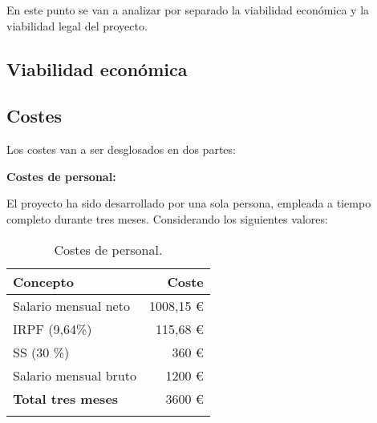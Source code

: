 En este punto se van a analizar por separado la viabilidad económica y la viabilidad legal del proyecto.

\subsection{Viabilidad económica}

\subsection{Costes}\label{costes}

Los costes van a ser desglosados en dos partes:

\textbf{Costes de personal:}

El proyecto ha sido desarrollado por una sola persona, empleada a tiempo completo durante tres meses. Considerando los siguientes valores:


\begin{longtable}[]{@{}lr@{}}
\toprule
\begin{minipage}[b]{0.38\columnwidth}\raggedright\strut
\textbf{Concepto}\strut
\end{minipage} & \begin{minipage}[b]{0.20\columnwidth}\raggedright\strut
\textbf{Coste}\strut
\end{minipage}\tabularnewline
\midrule
\endhead
\begin{minipage}[t]{0.38\columnwidth}\raggedright\strut
Salario mensual neto\strut
\end{minipage} & \begin{minipage}[t]{0.20\columnwidth}\raggedright\strut
1008,15 \euro{}\strut
\end{minipage}\tabularnewline
\begin{minipage}[t]{0.38\columnwidth}\raggedright\strut
IRPF (9,64\%)\strut
\end{minipage} & \begin{minipage}[t]{0.20\columnwidth}\raggedright\strut
115,68 \euro{}\strut
\end{minipage}\tabularnewline
\begin{minipage}[t]{0.38\columnwidth}\raggedright\strut
SS (30 \%)\strut
\end{minipage} & \begin{minipage}[t]{0.20\columnwidth}\raggedright\strut
360 \euro{}\strut
\end{minipage}\tabularnewline
\begin{minipage}[t]{0.38\columnwidth}\raggedright\strut
Salario mensual bruto\strut
\end{minipage} & \begin{minipage}[t]{0.20\columnwidth}\raggedright\strut
1200 \euro{}\strut
\end{minipage}\tabularnewline
\midrule
\begin{minipage}[t]{0.38\columnwidth}\raggedright\strut
\textbf{Total tres meses}\strut
\end{minipage} & \begin{minipage}[t]{0.20\columnwidth}\raggedright\strut
3600 \euro{}\strut
\end{minipage}\tabularnewline
\bottomrule
\caption{Costes de personal.}
\end{longtable}

